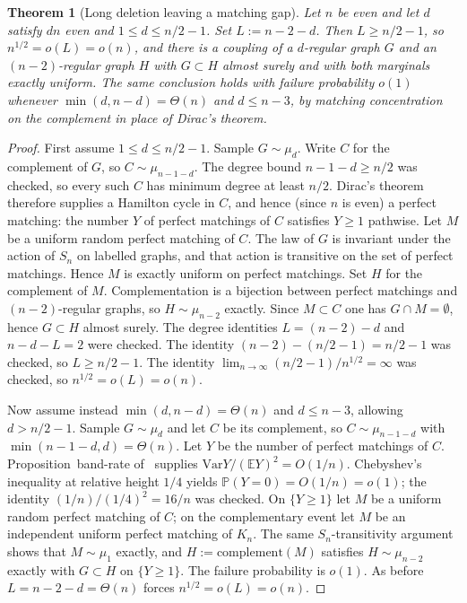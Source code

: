 \documentclass[11pt]{article}
\newtheorem{theorem}{Theorem}
\newcommand{\EE}{\mathbb{E}}
\newcommand{\PP}{\mathbb{P}}
\newcommand{\Var}{\mathrm{Var}}
\begin{document}
\begin{theorem}[Long deletion leaving a matching gap]
\label{thm:long-matching-gap}
Let \(n\) be even and let \(d\) satisfy \(dn\) even and \(1\le d\le n/2-1\).
Set \(L:=n-2-d\). Then \(L\ge n/2-1\), so \(n^{1/2}=o(L)=o(n)\), and there is a
coupling of a \(d\)-regular graph \(G\) and an \((n-2)\)-regular graph \(H\) with
\(G\subset H\) almost surely and with both marginals exactly uniform.
The same conclusion holds with failure probability \(o(1)\) whenever
\(\min(d,n-d)=\Theta(n)\) and \(d\le n-3\), by matching concentration on the
complement in place of Dirac's theorem.
\end{theorem}

\begin{proof}
First assume \(1\le d\le n/2-1\). Sample \(G\sim\mu_d\). Write \(C\) for the
complement of \(G\), so \(C\sim\mu_{n-1-d}\). The degree bound
\(n-1-d\ge n/2\) was checked, so every such \(C\) has minimum degree at least
\(n/2\). Dirac's theorem therefore supplies a Hamilton cycle in \(C\), and hence
(since \(n\) is even) a perfect matching: the number \(Y\) of perfect matchings of
\(C\) satisfies \(Y\ge 1\) pathwise.
Let \(M\) be a uniform random perfect matching of \(C\). The law of \(G\) is
invariant under the action of \(S_n\) on labelled graphs, and that action is
transitive on the set of perfect matchings. Hence \(M\) is exactly uniform on
perfect matchings.
Set \(H\) for the complement of \(M\). Complementation is a bijection between
perfect matchings and \((n-2)\)-regular graphs, so \(H\sim\mu_{n-2}\) exactly.
Since \(M\subset C\) one has \(G\cap M=\emptyset\), hence \(G\subset H\) almost surely.
The degree identities \(L=(n-2)-d\) and \(n-d-L=2\) were checked. The identity
\((n-2)-(n/2-1)=n/2-1\) was checked, so \(L\ge n/2-1\). The identity
\(\lim_{n\to\infty}(n/2-1)/n^{1/2}=\infty\) was checked, so
\(n^{1/2}=o(L)=o(n)\).

Now assume instead \(\min(d,n-d)=\Theta(n)\) and \(d\le n-3\), allowing
\(d>n/2-1\). Sample \(G\sim\mu_d\) and let \(C\) be its complement, so
\(C\sim\mu_{n-1-d}\) with \(\min(n-1-d,d)=\Theta(n)\). Let \(Y\) be the number of
perfect matchings of \(C\). Proposition~band-rate of~\cite{PlusOneV1} supplies
\(\Var Y/(\EE Y)^2=O(1/n)\). Chebyshev's inequality at relative height \(1/4\)
yields \(\PP(Y=0)=O(1/n)=o(1)\); the identity \((1/n)/(1/4)^2=16/n\) was checked.
On \(\{Y\ge 1\}\) let \(M\) be a uniform random perfect matching of \(C\); on the
complementary event let \(M\) be an independent uniform perfect matching of
\(K_n\). The same \(S_n\)-transitivity argument shows that \(M\sim\mu_1\) exactly, and
\(H:=\mathrm{complement}(M)\) satisfies \(H\sim\mu_{n-2}\) exactly with
\(G\subset H\) on \(\{Y\ge 1\}\). The failure probability is \(o(1)\). As before
\(L=n-2-d=\Theta(n)\) forces \(n^{1/2}=o(L)=o(n)\).
\end{proof}
\end{document}
